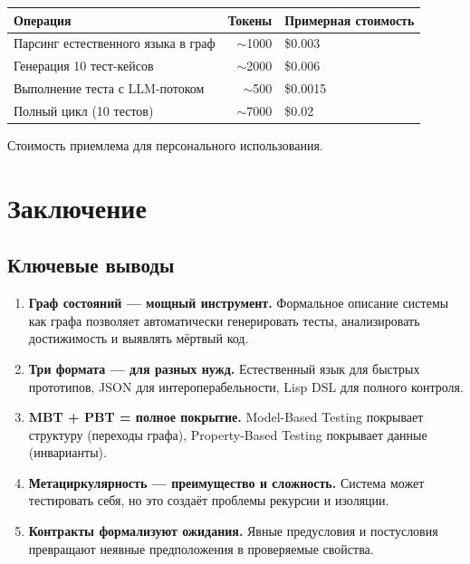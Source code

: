 \documentclass[10pt, oneside]{article}
\begin{document}
\begin{center}
\begin{tabular}{lrl}
  \toprule
  \textbf{Операция} & \textbf{Токены} & \textbf{Примерная стоимость} \\
  \midrule
  Парсинг естественного языка в граф & $\sim$1000 & \$0.003 \\
  Генерация 10 тест-кейсов & $\sim$2000 & \$0.006 \\
  Выполнение теста с LLM-потоком & $\sim$500 & \$0.0015 \\
  Полный цикл (10 тестов) & $\sim$7000 & \$0.02 \\
  \bottomrule
\end{tabular}
\end{center}

Стоимость приемлема для персонального использования.

\section{Заключение}

\subsection{Ключевые выводы}

\begin{enumerate}[leftmargin=1.5em]
  \item \textbf{Граф состояний --- мощный инструмент.} Формальное описание
    системы как графа позволяет автоматически генерировать тесты, анализировать
    достижимость и выявлять мёртвый код.

  \item \textbf{Три формата --- для разных нужд.} Естественный язык для
    быстрых прототипов, JSON для интероперабельности, Lisp DSL для полного
    контроля.

  \item \textbf{MBT + PBT = полное покрытие.} Model-Based Testing покрывает
    структуру (переходы графа), Property-Based Testing покрывает данные
    (инварианты).

  \item \textbf{Метациркулярность --- преимущество и сложность.} Система
    может тестировать себя, но это создаёт проблемы рекурсии и изоляции.

  \item \textbf{Контракты формализуют ожидания.} Явные предусловия и
    постусловия превращают неявные предположения в проверяемые свойства.
\end{enumerate}
\end{document}
